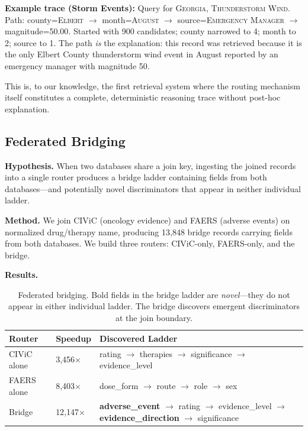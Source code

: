 \documentclass[11pt]{article}
\begin{document}
\textbf{Example trace (Storm Events):} Query for \textsc{Georgia, Thunderstorm Wind}. Path: county=\textsc{Elbert} $\to$ month=\textsc{August} $\to$ source=\textsc{Emergency Manager} $\to$ magnitude=\textsc{50.00}. Started with 900 candidates; county narrowed to 4; month to 2; source to 1. The path \textit{is} the explanation: this record was retrieved because it is the only Elbert County thunderstorm wind event in August reported by an emergency manager with magnitude 50.

This is, to our knowledge, the first retrieval system where the routing mechanism itself constitutes a complete, deterministic reasoning trace without post-hoc explanation.

\subsection{Federated Bridging}

\textbf{Hypothesis.} When two databases share a join key, ingesting the joined records into a single router produces a bridge ladder containing fields from both databases---and potentially novel discriminators that appear in neither individual ladder.

\textbf{Method.} We join CIViC (oncology evidence) and FAERS (adverse events) on normalized drug/therapy name, producing 13{,}848 bridge records carrying fields from both databases. We build three routers: CIViC-only, FAERS-only, and the bridge.

\textbf{Results.}

\begin{table}[h]
\centering
\begin{tabular}{llp{7.5cm}}
\toprule
Router & Speedup & Discovered Ladder \\
\midrule
CIViC alone & 3{,}456$\times$ & rating $\to$ therapies $\to$ significance $\to$ evidence\_level \\
FAERS alone & 8{,}403$\times$ & dose\_form $\to$ route $\to$ role $\to$ sex \\
Bridge & 12{,}147$\times$ & \textbf{adverse\_event} $\to$ rating $\to$ evidence\_level $\to$ \textbf{evidence\_direction} $\to$ significance \\
\bottomrule
\end{tabular}
\caption{Federated bridging. Bold fields in the bridge ladder are \textit{novel}---they do not appear in either individual ladder. The bridge discovers emergent discriminators at the join boundary.}
\label{tab:federated}
\end{table}
\end{document}
